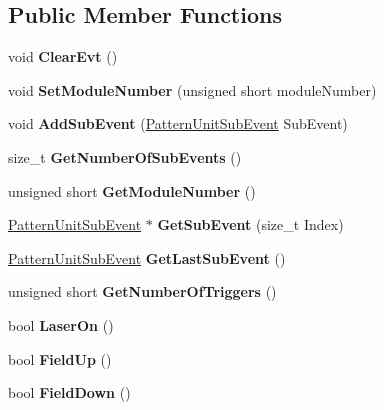 \subsection*{Public Member Functions}
\begin{DoxyCompactItemize}
\item 
\mbox{\label{class_pattern_unit_ac9996fb9db38fad22cd57fce80f6dd77}} 
void {\bfseries Clear\+Evt} ()
\item 
\mbox{\label{class_pattern_unit_a14ae7bedf1a45782eec52f50d3ae4349}} 
void {\bfseries Set\+Module\+Number} (unsigned short module\+Number)
\item 
\mbox{\label{class_pattern_unit_a9d34e1e9f1a313afb387a008f10fc1e5}} 
void {\bfseries Add\+Sub\+Event} (\hyperlink{class_pattern_unit_sub_event}{Pattern\+Unit\+Sub\+Event} Sub\+Event)
\item 
\mbox{\label{class_pattern_unit_afc5e06336605ed36e329017cf96e7ba9}} 
size\+\_\+t {\bfseries Get\+Number\+Of\+Sub\+Events} ()
\item 
\mbox{\label{class_pattern_unit_a76203a82503fc512426839b394bb39d3}} 
unsigned short {\bfseries Get\+Module\+Number} ()
\item 
\mbox{\label{class_pattern_unit_ae664a0f15c9b3b6fe3809b68838b9522}} 
\hyperlink{class_pattern_unit_sub_event}{Pattern\+Unit\+Sub\+Event} $\ast$ {\bfseries Get\+Sub\+Event} (size\+\_\+t Index)
\item 
\mbox{\label{class_pattern_unit_a914db6bc2faec9ee115aa8006be3fbf8}} 
\hyperlink{class_pattern_unit_sub_event}{Pattern\+Unit\+Sub\+Event} {\bfseries Get\+Last\+Sub\+Event} ()
\item 
\mbox{\label{class_pattern_unit_ab2eba4fd8bb10266198efb2aea53a789}} 
unsigned short {\bfseries Get\+Number\+Of\+Triggers} ()
\item 
\mbox{\label{class_pattern_unit_abac0e1b9460239ec7cbcdb050f995193}} 
bool {\bfseries Laser\+On} ()
\item 
\mbox{\label{class_pattern_unit_a2613100013a287640343ed0a791efaff}} 
bool {\bfseries Field\+Up} ()
\item 
\mbox{\label{class_pattern_unit_abaae7087af48725d48c8231e81ac9c7d}} 
bool {\bfseries Field\+Down} ()
\end{DoxyCompactItemize}
